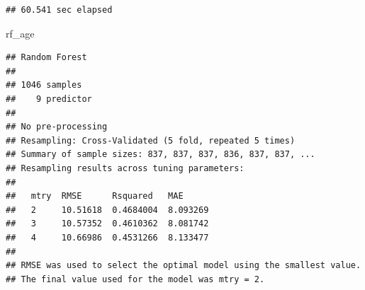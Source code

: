 \documentclass[
]{article}
\newenvironment{Shaded}{\begin{snugshade}}{\end{snugshade}}
\newcommand{\AttributeTok}[1]{\textcolor[rgb]{0.77,0.63,0.00}{#1}}
\newcommand{\ConstantTok}[1]{\textcolor[rgb]{0.00,0.00,0.00}{#1}}
\newcommand{\DecValTok}[1]{\textcolor[rgb]{0.00,0.00,0.81}{#1}}
\newcommand{\FunctionTok}[1]{\textcolor[rgb]{0.00,0.00,0.00}{#1}}
\newcommand{\NormalTok}[1]{#1}
\newcommand{\OtherTok}[1]{\textcolor[rgb]{0.56,0.35,0.01}{#1}}
\newcommand{\SpecialCharTok}[1]{\textcolor[rgb]{0.00,0.00,0.00}{#1}}
\newcommand{\StringTok}[1]{\textcolor[rgb]{0.31,0.60,0.02}{#1}}
\begin{document}
\begin{Shaded}
\end{Shaded}

\begin{verbatim}
## 60.541 sec elapsed
\end{verbatim}

\begin{Shaded}
\begin{Highlighting}[]
\NormalTok{rf\_age}
\end{Highlighting}
\end{Shaded}

\begin{verbatim}
## Random Forest 
## 
## 1046 samples
##    9 predictor
## 
## No pre-processing
## Resampling: Cross-Validated (5 fold, repeated 5 times) 
## Summary of sample sizes: 837, 837, 837, 836, 837, 837, ... 
## Resampling results across tuning parameters:
## 
##   mtry  RMSE      Rsquared   MAE     
##   2     10.51618  0.4684004  8.093269
##   3     10.57352  0.4610362  8.081742
##   4     10.66986  0.4531266  8.133477
## 
## RMSE was used to select the optimal model using the smallest value.
## The final value used for the model was mtry = 2.
\end{verbatim}
\end{document}
